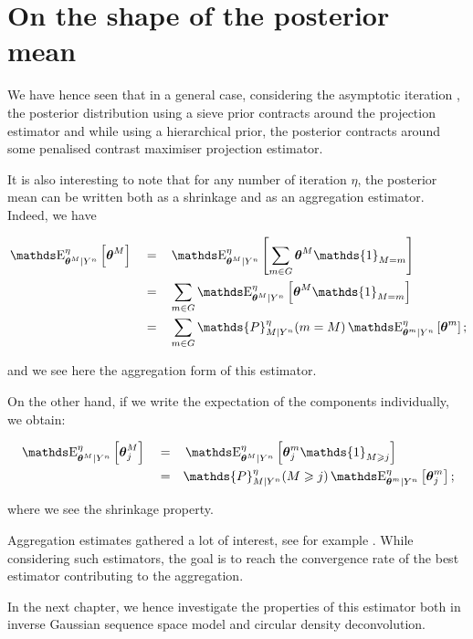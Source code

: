 \section{On the shape of the posterior mean}\label{BAYES_POSTMEAN}

We have hence seen that in a general case, considering the asymptotic iteration , the posterior distribution using a sieve prior contracts around the projection estimator and while using a hierarchical prior, the posterior contracts around some penalised contrast maximiser projection estimator.

It is also interesting to note that for any number of iteration $\eta$, the posterior mean can be written both as a shrinkage and as an aggregation estimator.
Indeed, we have

\begin{alignat*}{3}
& \E_{\boldsymbol{\theta}^{M}\vert Y^{n}}^{\eta}\left[\boldsymbol{\theta}^{M}\right] && = && \E_{\boldsymbol{\theta}^{M}\vert Y^{n}}^{\eta}\left[\sum\limits_{m \in G} \boldsymbol{\theta}^{M} \mathds{1}_{M = m}\right]\\
& && = && \sum\limits_{m \in G} \E_{\boldsymbol{\theta}^{M}\vert Y^{n}}^{\eta}\left[ \boldsymbol{\theta}^{M} \mathds{1}_{M = m}\right]\\
& && = && \sum\limits_{m \in G} \mathds{P}_{M \vert Y^{n}}^{\eta}(m = M) \E_{\boldsymbol{\theta}^{m}\vert Y^{n}}^{\eta}\left[ \boldsymbol{\theta}^{m} \right];
\end{alignat*}

and we see here the aggregation form of this estimator.

On the other hand, if we write the expectation of the components individually, we obtain:

\begin{alignat*}{3}
& \E_{\boldsymbol{\theta}^{M}\vert Y^{n}}^{\eta}\left[\boldsymbol{\theta}_{j}^{M}\right] && = && \E_{\boldsymbol{\theta}^{M}\vert Y^{n}}^{\eta}\left[ \boldsymbol{\theta}_{j}^{m} \mathds{1}_{M \geq j}\right]\\
& && = && \mathds{P}_{M \vert Y^{n}}^{\eta}(M \geq j) \E_{\boldsymbol{\theta}^{m}\vert Y^{n}}^{\eta}\left[ \boldsymbol{\theta}^{m}_{j} \right];
\end{alignat*}

where we see the shrinkage property.

\medskip

Aggregation estimates gathered a lot of interest, see for example .
While considering such estimators, the goal is to reach the convergence rate of the best estimator contributing to the aggregation.

\medskip

In the next chapter, we hence investigate the properties of this estimator both in inverse Gaussian sequence space model and circular density deconvolution.
